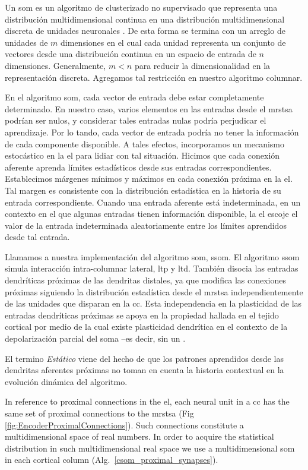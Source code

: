 {Un \gls{som} es un algoritmo de clusterizado no supervisado que representa una distribución multidimensional continua
en una distribución multidimensional discreta de unidades neuronales \cite{Kohonen:1989:SAM:69371, kohonen_2082}.
De esta forma se termina con un arreglo de unidades de $m$ dimensiones en el cual cada unidad
representa un conjunto de vectores desde una distribución continua en un espacio de entrada de $n$ dimensiones.
Generalmente, $m < n$ para reducir la dimensionalidad en la representación discreta.
Agregamos tal restricción en nuestro algoritmo columnar.

En el algoritmo \gls{som}, cada vector de entrada debe estar completamente determinado.
En nuestro caso, varios elementos en las entradas desde el \gls{mrstsa} podrían ser nulos,
y considerar tales entradas nulas podría perjudicar el aprendizaje.
Por lo tando, cada vector de entrada podría no tener la información de cada componente disponible.
A tales efectos, incorporamos un mecanismo estocástico en la \gls{el} para lidiar con tal situación.
Hicimos que cada conexión aferente aprenda límites estadísticos desde sus entradas correspondientes.
Establecimos márgenes mínimos y máximos en cada conexión próxima en la \gls{el}.
Tal margen es consistente con la distribución estadística en la historia de su entrada correspondiente.
Cuando una entrada aferente está indeterminada, en un contexto en el que algunas entradas tienen información disponible,
la \gls{el} escoje el valor de la entrada indeterminada aleatoriamente
entre los límites aprendidos desde tal entrada.

Llamamos a nuestra implementación del algoritmo \gls{som}, \gls{ssom}.
El algoritmo \gls{ssom} simula interacción intra-columnar lateral, \gls{ltp} y \gls{ltd}.
También disocia las entradas dendríticas próximas de las dendritas distales, ya que
modifica  las conexiones próximas siguiendo la distribución estadística desde el \gls{mrstsa}
independientemente de las unidades que disparan en la \gls{cc}.
Esta independencia en la plasticidad de las entradas dendríticas próximas se apoya en la propiedad
hallada en el tejido cortical por medio de la cual existe plasticidad dendrítica
en el contexto de la depolarización parcial del soma \cite{reiter_1998}--es decir, sin un .

El termino \textit{Estático} viene del hecho de que los patrones aprendidos desde las dendritas aferentes próximas
no toman en cuenta la historia contextual en la evolución dinámica del algoritmo.
}{
In reference to proximal connections in the \gls{el}, each neural unit in a \gls{cc} has the same set of
proximal connections to the \gls{mrstsa} (Fig \ref{fig:EncoderProximalConnections}).
Such connections constitute a multidimensional space of real numbers.
In order to acquire the statistical distribution in such multidimensional real space we use
a multidimensional \gls{som} in each cortical column (Alg.~\ref{csom_proximal_synapses}).

}

